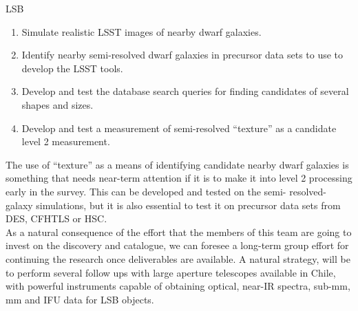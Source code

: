 \begin{tasklist}{LSB}
\begin{task}
{\begin{enumerate}
\item Simulate realistic LSST images of nearby dwarf galaxies.
\item Identify nearby semi-resolved dwarf galaxies in precursor data sets to use to develop the LSST tools.
\item Develop and test the database search queries for finding candidates of several shapes and sizes.
\item Develop and test a measurement of semi-resolved ``texture'' as a candidate level 2 measurement.
\end{enumerate}
The use of ``texture'' as a means of identifying candidate nearby dwarf galaxies is something that needs near-term attention if it is to make it into level 2 processing early in the survey. This can be developed and tested on the semi- resolved-galaxy simulations, but it is also essential to test it on precursor data sets from DES, CFHTLS or HSC.
\\
As a natural consequence of the effort that the members of this team are going to invest on the discovery and catalogue, we can foresee a long-term group effort for continuing the research once deliverables are available. A natural strategy, will be to perform several follow ups with large aperture telescopes available in Chile, with powerful instruments capable of obtaining optical, near-IR spectra, sub-mm, mm and IFU data for LSB objects.
}
\end{task}




\end{tasklist}
